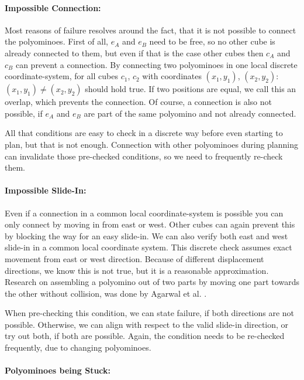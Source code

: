\paragraph{Impossible Connection:}

Most reasons of failure resolves around the fact, that it is not possible to connect the polyominoes.
First of all, $e_A$ and $e_B$ need to be free, so no other cube is already connected to them, but even if that is the case other cubes then $c_A$ and $c_B$ can prevent a connection.
By connecting two polyominoes in one local discrete coordinate-system, for all cubes $c_1$, $c_2$ with coordinates $(x_1, y_1)$, $(x_2, y_2)$: $(x_1, y_1) \neq (x_2, y_2)$ should hold true.
If two positions are equal, we call this an overlap, which prevents the connection.
Of course, a connection is also not possible, if $e_A$ and $e_B$ are part of the same polyomino and not already connected.

All that conditions are easy to check in a discrete way before even starting to plan, but that is not enough.
Connection with other polyominoes during planning can invalidate those pre-checked conditions, so we need to frequently re-check them.

\paragraph{Impossible Slide-In:}

Even if a connection in a common local coordinate-system is possible you can only connect by moving in from east or west.
Other cubes can again prevent this by blocking the way for an easy slide-in.
We can also verify both east and west slide-in in a common local coordinate system.
This discrete check assumes exact movement from east or west direction.
Because of different displacement directions, we know this is not true, but it is a reasonable approximation.
Research on assembling a polyomino out of two parts by moving one part towards the other without collision, was done by Agarwal et al. \cite{agarwal2021}. 

When pre-checking this condition, we can state failure, if both directions are not possible.
Otherwise, we can align with respect to the valid slide-in direction, or try out both, if both are possible.
Again, the condition needs to be re-checked frequently, due to changing polyominoes.

\paragraph{Polyominoes being Stuck:}

